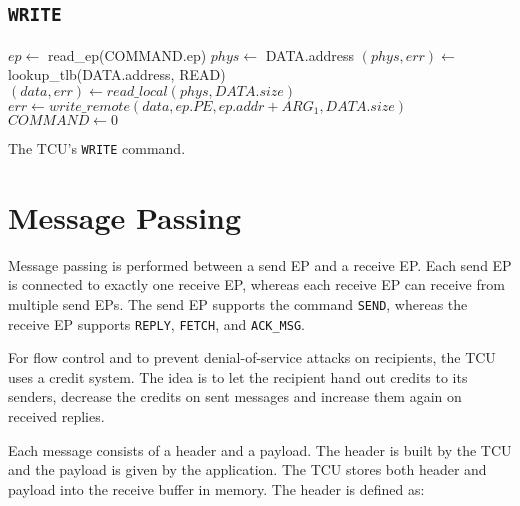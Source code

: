 \subsection{\texttt{WRITE}}

\begin{algorithm}[H]
    $ep \gets$ read\_ep(COMMAND.ep)\;
    \extend{}
    \BlankLine
    $phys \gets$ DATA.address\;
    $(phys, err) \gets$ lookup\_tlb(DATA.address, READ)\;
    \extend{}
    \BlankLine
    $(data, err) \gets read\_local(phys, DATA.size)$\;
    \extend{}
    $err \gets write\_remote(data, ep.PE, ep.addr + ARG_1, DATA.size)$\;
    \extend{}
    \BlankLine
    $COMMAND \gets 0$\;
    \caption{The TCU's \texttt{WRITE} command.}
\end{algorithm}

\section{Message Passing}

Message passing is performed between a send EP and a receive EP. Each send EP is connected to
exactly one receive EP, whereas each receive EP can receive from multiple send EPs. The send EP
supports the command \texttt{SEND}, whereas the receive EP supports \texttt{REPLY}, \texttt{FETCH},
and \texttt{ACK\_MSG}.

For flow control and to prevent denial-of-service attacks on recipients, the TCU uses a credit
system. The idea is to let the recipient hand out credits to its senders, decrease the credits on
sent messages and increase them again on received replies.

Each message consists of a header and a payload. The header is built by the TCU and the payload is
given by the application. The TCU stores both header and payload into the receive buffer in memory.
The header is defined as:

